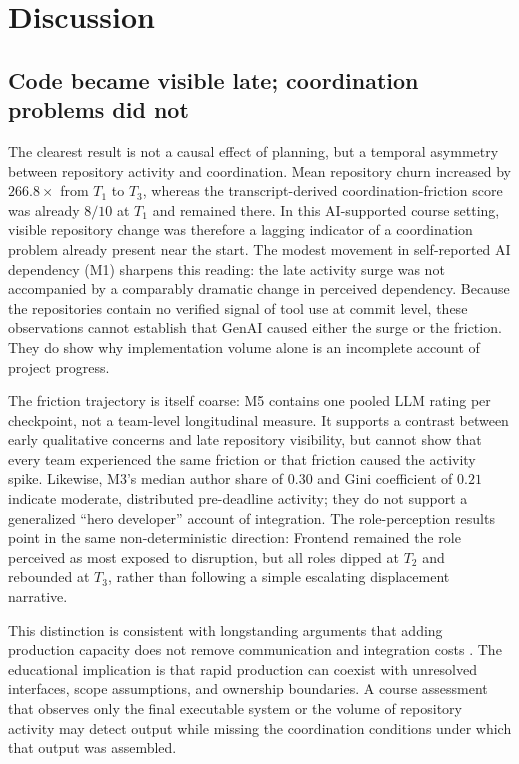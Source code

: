 \documentclass[conference]{IEEEtran}
\begin{document}
\section{Discussion}
\label{sec:discussion}

\subsection{Code became visible late; coordination problems did not}

The clearest result is not a causal effect of planning, but a temporal
asymmetry between repository activity and coordination. Mean repository churn increased
by $266.8\times$ from $T_1$ to $T_3$, whereas the transcript-derived
coordination-friction score was already $8/10$ at $T_1$ and remained there.
In this AI-supported course setting, visible repository change was therefore a
lagging indicator of a coordination problem already present near the start.
The modest movement in self-reported AI dependency (M1) sharpens this reading:
the late activity surge was not accompanied by a comparably dramatic change
in perceived dependency. Because the repositories contain no verified signal
of tool use at commit level, these observations cannot establish that GenAI
caused either the surge or the friction. They do show why implementation
volume alone is an incomplete account of project progress.

The friction trajectory is itself coarse: M5 contains one pooled LLM rating
per checkpoint, not a team-level longitudinal measure. It supports a contrast
between early qualitative concerns and late repository visibility, but cannot
show that every team experienced the same friction or that friction caused the
activity spike. Likewise, M3's median author share of $0.30$ and Gini
coefficient of $0.21$ indicate moderate, distributed pre-deadline activity;
they do not support a generalized ``hero developer'' account of integration.
The role-perception results point in the same non-deterministic direction:
Frontend remained the role perceived as most exposed to disruption, but all
roles dipped at $T_2$ and rebounded at $T_3$, rather than following a simple
escalating displacement narrative.

This distinction is consistent with longstanding arguments that adding
production capacity does not remove communication and integration costs
\cite{brooks_1975_mythical_man_month,demarco_lister_1987_peopleware}. The
educational implication is that rapid production can coexist with unresolved
interfaces, scope assumptions, and ownership boundaries. A course assessment
that observes only the final executable system or the volume of repository
activity may detect output while missing the coordination conditions under
which that output was assembled.
\end{document}
